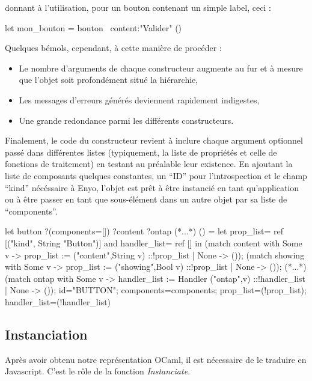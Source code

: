 donnant à l'utilisation, pour un bouton contenant un simple label, ceci :

\label{bouton_kind_ex}
\begin{OCaml}
  let mon_bouton = bouton ~content:"Valider" ()
\end{OCaml}

Quelques bémols, cependant, à cette manière de procéder :
\begin{itemize}
\item Le nombre d'arguments de chaque constructeur augmente au fur et à mesure que l'objet
soit profondément situé la hiérarchie,
\item Les messages d'erreurs générés deviennent rapidement indigestes,
\item Une grande redondance parmi les différents constructeurs.
\end{itemize}

Finalement, le code du constructeur revient à inclure chaque argument optionnel passé dans différentes 
listes (typiquement, la liste de propriétés et celle de fonctions de traitement) en testant
au préalable leur existence.
En ajoutant la liste de composants quelques constantes, un ``ID'' pour l'introspection et 
le champ ``kind'' nécéssaire à Enyo, l'objet est prêt à être instancié en tant qu'application 
ou à être passer en tant que sous-élément dans un autre objet par sa liste de ``components''.

\begin{OCaml}
  let button
      ?(components=[])
      ?content
      ?ontap
      (*...*)
      () =
    let prop_list= ref [("kind", String "Button")]
    and handler_list= ref [] in
    (match content with 
        Some v -> prop_list := ("content",String v)
                               ::!prop_list 
        | None -> ());
    (match showing with 
        Some v -> prop_list := ("showing",Bool v)
                               ::!prop_list 
        | None -> ());
    (*...*)
    (match ontap with 
        Some v -> handler_list := Handler ("ontap",v)
                                  ::!handler_list 
        | None -> ());
    {id="BUTTON"; 
     components=components;
     prop_list=(!prop_list);
     handler_list=(!handler_list)}
\end{OCaml}

\subsection{Instanciation}

Après avoir obtenu notre représentation OCaml, il est nécessaire de le traduire en Javascript.
C'est le rôle de la fonction \emph{Instanciate}.

